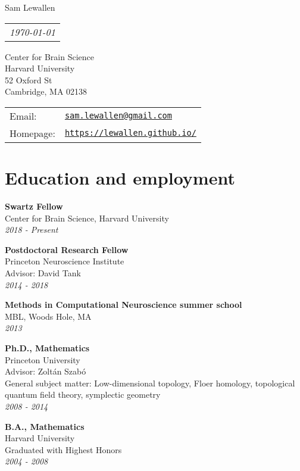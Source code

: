 \documentclass[letterpaper]{article}
\makeatletter
\def\name{Sam Lewallen}
\def\email{sam.lewallen@gmail.com}
\def\url{https://lewallen.github.io/}
\def\address{
Center for Brain Science \\
Harvard University \\
52 Oxford St \\
Cambridge, MA 02138  
}
\def\lsk{\\[.15em]}
\renewenvironment{itemize}{
  \begin{list}{}{
    \setlength{\leftmargin}{1.5em}
  }
}{
  \end{list}
}
\makeatother
\begin{document}
{\huge \name}
\hfill%
\begin{tabular}[t]{l@{}}
\textit{\today}
\end{tabular}
\vspace{0.4in}

\begin{minipage}{0.45\linewidth}
\address
\end{minipage}
\begin{minipage}{0.45\linewidth}
  \begin{tabular}{ll}
    Email: & \href{mailto:\email}{\tt \email} \\
    Homepage: & \href{\url}{\tt \url} \\
  \end{tabular}
\end{minipage}

\section*{Education and employment}
\begin{itemize}
\item \textbf{Swartz Fellow} \lsk
Center for Brain Science, Harvard University \lsk
\textit{2018 - Present} \\

\item \textbf{Postdoctoral Research Fellow} \lsk
Princeton Neuroscience Institute \lsk
Advisor: David Tank \lsk
\textit{2014 - 2018} \\

\item \textbf{Methods in Computational Neuroscience summer school} \lsk
MBL, Woods Hole, MA \lsk
\textit{2013} \\

\item \textbf{Ph.D., Mathematics} \lsk
Princeton University \lsk
Advisor: Zolt\'{a}n Szab\'{o} \lsk
General subject matter: Low-dimensional topology, Floer homology, topological quantum field theory, symplectic geometry \lsk
\textit{2008 - 2014} \\
\item \textbf{B.A., Mathematics} \lsk
Harvard University \lsk
Graduated with Highest Honors \lsk
\textit{2004 - 2008}
  \end{itemize}
\end{document}

